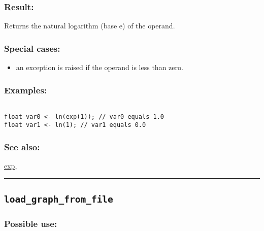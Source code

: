 \documentclass[]{book}
\providecommand{\tightlist}{%
  \setlength{\itemsep}{0pt}\setlength{\parskip}{0pt}}
\theoremstyle{definition}
\theoremstyle{definition}
\theoremstyle{definition}
\theoremstyle{remark}
\begin{document}
\subsubsection{Result:}\label{result-315}

Returns the natural logarithm (base e) of the operand.

\subsubsection{Special cases:}\label{special-cases-90}

\begin{itemize}
\tightlist
\item
  an exception is raised if the operand is less than zero.
\end{itemize}

\subsubsection{Examples:}\label{examples-225}

\begin{verbatim}
 
float var0 <- ln(exp(1)); // var0 equals 1.0 
float var1 <- ln(1); // var1 equals 0.0
\end{verbatim}

\subsubsection{See also:}\label{see-also-128}

\href{OperatorsDH\#exp}{exp},

\begin{center}\rule{0.5\linewidth}{\linethickness}\end{center}

\subsection{\texorpdfstring{\texttt{load\_graph\_from\_file}}{load\_graph\_from\_file}}\label{load_graph_from_file}

\subsubsection{Possible use:}\label{possible-use-326}
\end{document}
